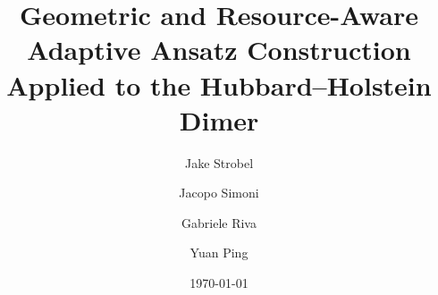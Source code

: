 \documentclass[
  reprint,
  amsmath,
  amssymb,
  aps,
  pra,
  nofootinbib,
  superscriptaddress,
  floatfix
]{revtex4-2}
\begin{document}
\makeatletter
\def\bibsection{\section*{\refname}\@nobreaktrue}
\makeatother

\title{Geometric and Resource-Aware Adaptive Ansatz Construction Applied to the Hubbard--Holstein Dimer}

\author{Jake Strobel}
\author{Jacopo Simoni}
\author{Gabriele Riva}
\author{Yuan Ping}

\date{\today}

\end{document}
